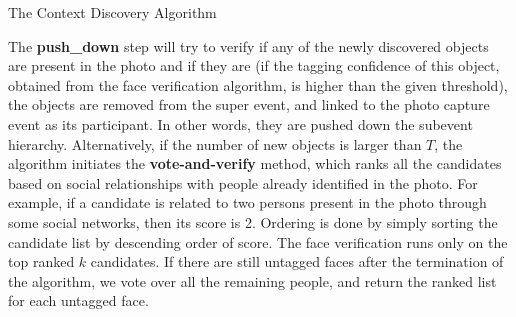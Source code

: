 \SetAlgoSkip{}
\begin{algorithm}[h!]
\dontprintsemicolon 
{}
\caption{The Context Discovery Algorithm}
\label{alg:cx-alg}
\end{algorithm}

The \textbf{push\_down} step will try to verify if any of the newly discovered objects are present in the photo and if they are (if the tagging confidence of this object, obtained from the face verification algorithm, is higher than the given threshold), the objects are removed from the super event, and linked to the photo capture event as its participant. In other words, they are pushed down the subevent hierarchy. Alternatively, if the number of new objects is larger than $T$, the algorithm initiates the \textbf{vote-and-verify} method, which ranks all the candidates based on social relationships with people already identified in the photo. For example, if a candidate is related to two persons present in the photo through some social networks, then its score is 2. Ordering is done by simply sorting the candidate list by descending order of score. The face verification runs only on the top ranked $k$ candidates. If there are still untagged faces after the termination of the algorithm, we vote over all the remaining people, and return the ranked list for each untagged face.

